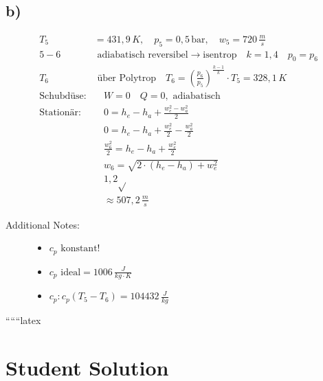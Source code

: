 

\subsection*{b)}

\begin{align*}
    T_5 &= 431,9 \, K, \quad p_5 = 0,5 \, \text{bar}, \quad w_5 = 720 \, \frac{m}{s} \\
    5-6 &\text{ adiabatisch reversibel} \rightarrow \text{isentrop} \quad k = 1,4 \quad p_0 = p_6 \\
    T_6 &\text{ über Polytrop} \quad T_6 = \left( \frac{p_6}{p_5} \right)^{\frac{k-1}{k}} \cdot T_5 = 328,1 \, K \\
    \text{Schubdüse:} &\quad W = 0 \quad Q = 0, \text{ adiabatisch} \\
    \text{Stationär:} &\quad 0 = h_e - h_a + \frac{w_e^2 - w_a^2}{2} \\
    &\quad 0 = h_e - h_a + \frac{w_e^2}{2} - \frac{w_a^2}{2} \\
    &\quad \frac{w_6^2}{2} = h_e - h_a + \frac{w_e^2}{2} \\
    &\quad w_6 = \sqrt{2 \cdot (h_e - h_a) + w_e^2} \\
    &\quad 1,2 \sqrt{} \\
    &\quad \approx 507,2 \, \frac{m}{s}
\end{align*}

\begin{description}
    \item[Additional Notes:] 
    \begin{itemize}
        \item $c_p \text{ konstant!}$
        \item $c_p \text{ ideal} = 1006 \, \frac{J}{kg \cdot K}$
        \item $c_p: c_p (T_5 - T_6) = 104432 \, \frac{J}{kg}$
    \end{itemize}
\end{description}

``````latex


\section*{Student Solution}